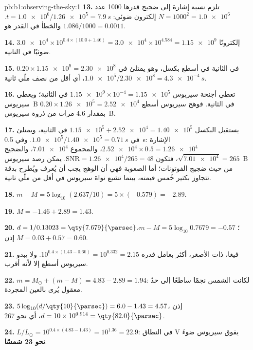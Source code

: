 \begin{solution}{pb:b1:observing-the-sky:1}
\textbf{13.} تلزم نسبة إشارة إلى ضجيج قدرها 1000 عدد $N = 1000^2 = \num{1.0e6}$
إلكترون ضوئي: $t = \num{1.0e6}/\num{1.26e5} = \qty{7.9}{s}$. والخطأ في القدر
هو $1.086/1000 = \num{0.0011}$.

\textbf{14.} $\num{3.0e4}\times10^{0.4\times(10.0 + 1.46)} = \num{3.0e4}
\times10^{4.584} = \num{1.15e9}$ إلكترونًا ضوئيًا في الثانية.

\textbf{15.} $0.20\times\num{1.15e9} = \num{2.30e8}$ في الثانية في أسطع بكسل،
وهو يمتلئ في $\num{1.0e5}/\num{2.30e8} =
\qty{4.3e-4}{s}$، أي أقل من نصف ملّي ثانية.

\textbf{16.} تعطي أجنحة سيريوس $\num{1.15e9}\times10^{-4} =
\num{1.15e5}$ في الثانية؛ ويعطي سيريوس~B $0.20\times\num{1.26e5} =
\num{2.52e4}$ في الثانية. فوهج سيريوس أسطع بمقدار 4.6 مرات من ذروة سيريوس~B.

\textbf{17.} يستقبل البكسل $\num{1.15e5} + \num{2.52e4} = \num{1.40e5}$
في الثانية، ويمتلئ في $\num{1.0e5}/\num{1.40e5} = \qty{0.71}{s}$. وفي
\qty{0.5}{s}: الإشارة $\num{2.52e4}\times0.5 = \num{1.26e4}$، والمجموع
$\num{7.01e4}$، والضجيج $\sqrt{\num{7.01e4}} = 265$، فتكون $\mathrm{SNR} =
\num{1.26e4}/265 = 48$. يمكن رصد سيريوس~B من حيث ضجيج الفوتونات؛ أما الصعوبة فهي أن الوهج يجب أن يُعرف ويُطرح بدقة تتجاوز بكثير خُمس قيمته، بينما تشبع نواة سيريوس في أقل من ملّي ثانية.

\textbf{18.} $m - M = 5\log_{10}(2.637/10) = 5\times(-0.579) = -2.89$.

\textbf{19.} $M = -1.46 + 2.89 = 1.43$.

\textbf{20.} $d = 1/0.13023 = \qty{7.679}{\parsec}$؛
$m - M = 5\log_{10}0.7679 = -0.57$، إذن $M = 0.03 + 0.57 = 0.60$.

\textbf{21.} فيغا، ذات  الأصغر، أكثر  بعامل قدره
$10^{0.4\times(1.43 - 0.60)} = 10^{0.332} = 2.15$. ولا يبدو سيريوس أسطع إلا لأنه أقرب.

\textbf{22.} $m = M_\odot + (m - M) = 4.83 - 2.89 = 1.94$: لكانت الشمس نجمًا ساطعًا إلى حدّ معقول يُرى بالعين المجردة.

\textbf{23.} $5\log_{10}(d/\qty{10}{\parsec}) = 6.0 - 1.43 = 4.57$، إذن
$d = 10\times10^{0.914} = \qty{82.0}{\parsec}$، أي نحو \qty{267}{\lightyear}.

\textbf{24.} $L/L_\odot = 10^{0.4\times(4.83 - 1.43)} = 10^{1.36} = 22.9$:
في النطاق V يفوق سيريوس ضوءَ \textbf{نحو 23 شمسًا}.
\end{solution}
